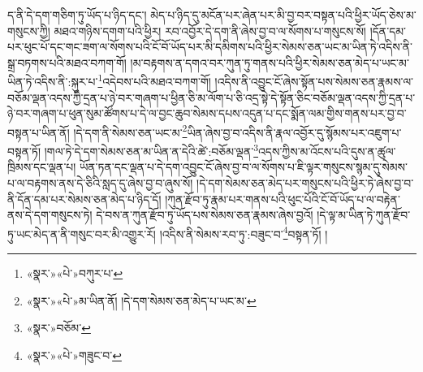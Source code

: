 ད་ནི་དེ་དག་གཅིག་ཏུ་ཡོད་པ་ཉིད་དང་། མེད་པ་ཉིད་དུ་མངོན་པར་ཞེན་པར་མི་བྱ་བར་བསྟན་པའི་ཕྱིར་ཡོད་ཅེས་མ་གསུངས་ཀྱི། མཐའ་གཉིས་དགག་པའི་ཕྱིར། རབ་འབྱོར་དེ་དག་ནི་ཞེས་བྱ་བ་ལ་སོགས་པ་གསུངས་སོ། །དོན་དམ་པར་ཕུང་པོ་དང་གང་ཟག་ལ་སོགས་པའི་ངོ་བོ་ཡོད་པར་མི་དམིགས་པའི་ཕྱིར་སེམས་ཅན་ཡང་མ་ཡིན་ཏེ་འདིས་ནི་སྒྲ་བཏགས་པའི་མཐའ་བཀག་གོ། །མ་བརྟགས་ན་དགའ་བར་ཀུན་ཏུ་གནས་པའི་ཕྱིར་སེམས་ཅན་མེད་པ་ཡང་མ་ཡིན་ཏེ་འདིས་ནི་:སྐུར་པ་\footnote{«སྣར་»«པེ་»བཀུར་པ་}འདེབས་པའི་མཐའ་བཀག་གོ། །འདིས་ནི་འབྱུང་ངོ་ཞེས་སྟོན་པས་སེམས་ཅན་རྣམས་ལ་བཅོམ་ལྡན་འདས་ཀྱི་དྲན་པ་ཉེ་བར་གཞག་པ་ཕྱིན་ཅི་མ་ལོག་པ་ཅི་འདྲ་སྟེ་དེ་སྟོན་ཅིང་བཅོམ་ལྡན་འདས་ཀྱི་དྲན་པ་ཉེ་བར་གཞག་པ་ཕུན་སུམ་ཚོགས་པ་དེ་ལ་བྱང་ཆུབ་སེམས་དཔས་འདུན་པ་དང་སྨོན་ལམ་གྱིས་གནས་པར་བྱ་བ་བསྟན་པ་ཡིན་ནོ། །དེ་དག་ནི་སེམས་ཅན་ཡང་མ་\footnote{«སྣར་»«པེ་»མ་ཡིན་ནོ། །དེ་དག་སེམས་ཅན་མེད་པ་ཡང་མ་}ཡིན་ཞེས་བྱ་བ་འདིས་ནི་རྣལ་འབྱོར་དུ་སྙོམས་པར་འཇུག་པ་བསྟན་ཏོ། །གལ་ཏེ་དེ་དག་སེམས་ཅན་མ་ཡིན་ན་དེའི་ཚེ་:བཅོམ་ལྡན་\footnote{«སྣར་»བཅོམ་}འདས་ཀྱིས་མ་འོངས་པའི་དུས་ན་ཚུལ་ཁྲིམས་དང་ལྡན་པ། ཡོན་ཏན་དང་ལྡན་པ་དེ་དག་འབྱུང་ངོ་ཞེས་བྱ་བ་ལ་སོགས་པ་ཇི་ལྟར་གསུངས་སྙམ་དུ་སེམས་པ་ལ་བརྟགས་ནས་དེ་ཅིའི་སླད་དུ་ཞེས་བྱ་བ་ཞུས་སོ། །དེ་དག་སེམས་ཅན་མེད་པར་གསུངས་པའི་ཕྱིར་ཏེ་ཞེས་བྱ་བ་ནི་དོན་དམ་པར་སེམས་ཅན་མེད་པ་ཉིད་དོ། །ཀུན་རྫོབ་ཏུ་རྣམ་པར་གནས་པའི་ཕུང་པོའི་ངོ་བོ་ཡོད་པ་ལ་བརྟེན་ནས་དེ་དག་གསུངས་ཏེ། དེ་བས་ན་ཀུན་རྫོབ་ཏུ་ཡོད་པས་སེམས་ཅན་རྣམས་ཞེས་བྱའོ། །དེ་ལྟ་མ་ཡིན་ཏེ་ཀུན་རྫོབ་ཏུ་ཡང་མེད་ན་ནི་གསུང་བར་མི་འགྱུར་རོ། །འདིས་ནི་སེམས་རབ་ཏུ་:བཟུང་བ་\footnote{«སྣར་»«པེ་»གཟུང་བ་}བསྟན་ཏོ། །
